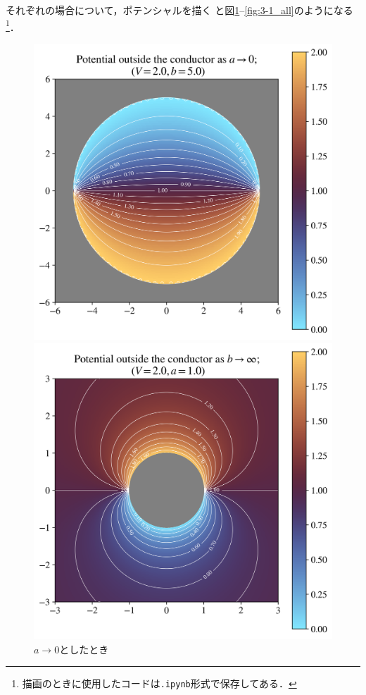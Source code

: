 それぞれの場合について，ポテンシャルを描く
と図\ref{fig:3-1_lima}--\ref{fig:3-1_all}のようになる\footnote{
  描画のときに使用したコードは\texttt{.ipynb}形式で保存してある．
}．
\begin{figure}[htbp]%
  \centering%
  \begin{minipage}{0.30\linewidth}
    \centering
    \includegraphics[width=\linewidth]{py/3-1_lima.png}%
    \caption{$a \to 0$としたとき}%
    \label{fig:3-1_lima}%
  \end{minipage}
  \begin{minipage}{0.30\linewidth}
    \centering
    \includegraphics[width=\linewidth]{py/3-1_limb.png}%

\end{minipage}
\end{figure}
